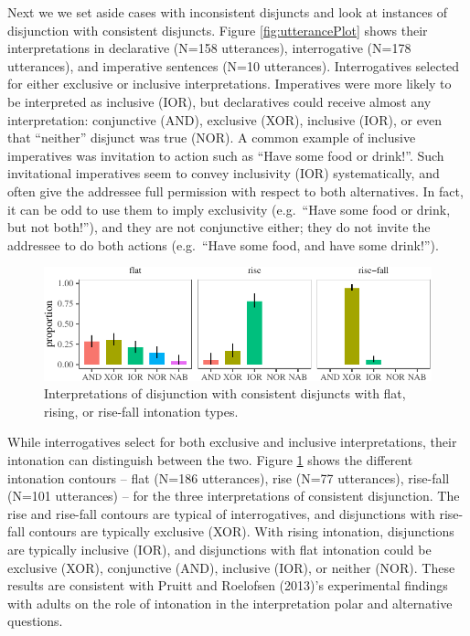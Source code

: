 \documentclass[
  ,man,floatsintext]{apa6}
\begin{document}
Next we we set aside cases with inconsistent disjuncts and look at instances of disjunction with consistent disjuncts. Figure \ref{fig:utterancePlot} shows their interpretations in declarative (N=158 utterances), interrogative (N=178 utterances), and imperative sentences (N=10 utterances). Interrogatives selected for either exclusive or inclusive interpretations. Imperatives were more likely to be interpreted as inclusive (IOR), but declaratives could receive almost any interpretation: conjunctive (AND), exclusive (XOR), inclusive (IOR), or even that ``neither'' disjunct was true (NOR). A common example of inclusive imperatives was invitation to action such as ``Have some food or drink!''. Such invitational imperatives seem to convey inclusivity (IOR) systematically, and often give the addressee full permission with respect to both alternatives. In fact, it can be odd to use them to imply exclusivity (e.g.~``Have some food or drink, but not both!''), and they are not conjunctive either; they do not invite the addressee to do both actions (e.g.~``Have some food, and have some drink!'').

\begin{figure}[H]

{\centering \includegraphics{figs/intonationPlot-1} 

}

\caption{Interpretations of disjunction with consistent disjuncts with flat, rising, or rise-fall intonation types.}\label{fig:intonationPlot}
\end{figure}

While interrogatives select for both exclusive and inclusive interpretations, their intonation can distinguish between the two. Figure \ref{fig:intonationPlot} shows the different intonation contours -- flat (N=186 utterances), rise (N=77 utterances), rise-fall (N=101 utterances) -- for the three interpretations of consistent disjunction. The rise and rise-fall contours are typical of interrogatives, and disjunctions with rise-fall contours are typically exclusive (XOR). With rising intonation, disjunctions are typically inclusive (IOR), and disjunctions with flat intonation could be exclusive (XOR), conjunctive (AND), inclusive (IOR), or neither (NOR). These results are consistent with Pruitt and Roelofsen (2013)'s experimental findings with adults on the role of intonation in the interpretation polar and alternative questions.
\end{document}
